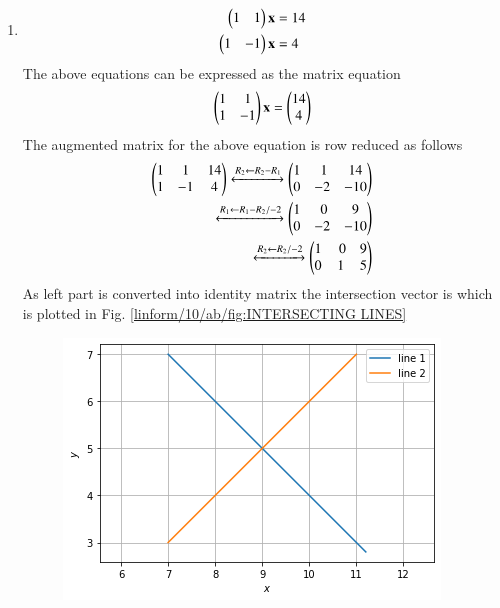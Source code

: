 \begin{enumerate}
\item
\begin{align}
\begin{split}
\begin{pmatrix}1 & 1 \end{pmatrix}\mathbf{x}&=14
\\
\begin{pmatrix}1 & -1 \end{pmatrix}\mathbf{x}&=4
\end{split}
\end{align}
The above equations can be expressed as the matrix equation
\begin{align}
\begin{pmatrix}1 & 1\\1 & -1\end{pmatrix} \mathbf{x} = \begin{pmatrix}14\\4\end{pmatrix}
\end{align}
%
The augmented matrix for the above equation is row reduced as follows
\begin{align}
\begin{pmatrix}1 & 1 & 14\\1 & -1 & 4\end{pmatrix} 
\xleftrightarrow {R_2\leftarrow R_2 -R_1}\begin{pmatrix}1 & \ 1 & 14 \\0 & -2 & -10 \end{pmatrix}
\\
\xleftrightarrow {R_1\leftarrow R_1 -R_2/-2}\begin{pmatrix}1 & \ 0 & 9 \\0 & -2 & -10 \end{pmatrix}
\\
\xleftrightarrow {R_2\leftarrow R_2/-2}\begin{pmatrix}1 & \ 0 & 9 \\0 & 1 & 5 \end{pmatrix}
\end{align}
%
As left part is converted into identity matrix the intersection vector is  which is plotted in Fig.     \ref{linform/10/ab/fig:INTERSECTING LINES}
%
\begin{figure}[ht!]
    \centering
    \includegraphics[width=\columnwidth]{solutions/su2021/2/10/ab/figure1.png}

\end{figure}
\end{enumerate}
